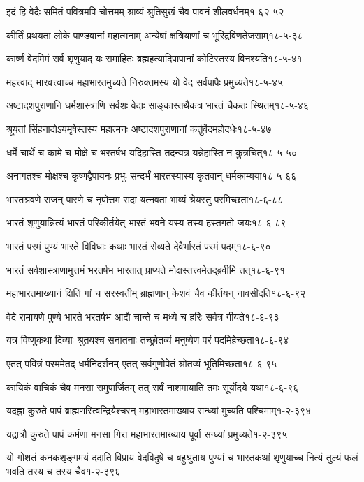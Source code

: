 \annotwolineshloka
{इदं हि वेदैः समितं पवित्रमपि चोत्तमम्}
{श्राव्यं श्रुतिसुखं चैव पावनं शीलवर्धनम्}{१-६२-५२}


\annotwolineshloka
{कीर्तिं प्रथयता लोके पाण्डवानां महात्मनाम्}
{अन्येषां क्षत्रियाणां च भूरिद्रविणतेजसाम्}{१८-५-३८}

\annotwolineshloka
{कार्ष्णं वेदमिमं सर्वं शृणुयाद् यः समाहितः}
{ब्रह्महत्यादिपापानां कोटिस्तस्य विनश्यति}{१८-५-४१}

\annotwolineshloka
{महत्त्वाद् भारवत्त्वाच्च महाभारतमुच्यते}
{निरुक्तमस्य यो वेद सर्वपापैः प्रमुच्यते}{१८-५-४५}

\annotwolineshloka
{अष्टादशपुराणानि धर्मशास्त्राणि सर्वशः}
{वेदाः साङ्कास्तथैकत्र भारतं चैकतः स्थितम्}{१८-५-४६}

\annotwolineshloka
{श्रूयतां सिंहनादोऽयमृषेस्तस्य महात्मनः}
{अष्टादशपुराणानां कर्तुर्वेदमहोदधेः}{१८-५-४७}

\annotwolineshloka
{धर्मे चार्थे च कामे च मोक्षे च भरतर्षभ}
{यदिहास्ति तदन्यत्र यन्नेहास्ति न कुत्रचित्}{१८-५-५०}

\annotwolineshloka
{अनागतश्च मोक्षश्च कृष्णद्वैपायनः प्रभुः}
{सन्दर्भं भारतस्यास्य कृतवान् धर्मकाम्यया}{१८-५-६६}

\annotwolineshloka
{भारतश्रवणे राजन् पारणे च नृपोत्तम}
{सदा यत्नवता भाव्यं श्रेयस्तु परमिच्छता}{१८-६-८८}

\annotwolineshloka
{भारतं शृणुयान्नित्यं भारतं परिकीर्तयेत्}
{भारतं भवने यस्य तस्य हस्तगतो जयः}{१८-६-८९}

\annotwolineshloka
{भारतं परमं पुण्यं भारते विविधाः कथाः}
{भारतं सेव्यते देवैर्भारतं परमं पदम्}{१८-६-९०}

\annotwolineshloka
{भारतं सर्वशास्त्राणामुत्तमं भरतर्षभ}
{भारतात् प्राप्यते मोक्षस्तत्त्वमेतद्ब्रवीमि तत्}{१८-६-९१}

\annotwolineshloka
{महाभारतमाख्यानं क्षितिं गां च सरस्वतीम्}
{ब्राह्मणान् केशवं चैव कीर्तयन् नावसीदति}{१८-६-९२}

\annotwolineshloka
{वेदे रामायणे पुण्ये भारते भरतर्षभ}
{आदौ चान्ते च मध्ये च हरिः सर्वत्र गीयते}{१८-६-९३}

\annotwolineshloka
{यत्र विष्णुकथा दिव्याः श्रुतयश्च सनातनाः}
{तच्छ्रोतव्यं मनुष्येण परं पदमिहेच्छता}{१८-६-९४}

\annotwolineshloka
{एतत् पवित्रं परममेतद् धर्मनिदर्शनम्}
{एतत् सर्वगुणोपेतं श्रोतव्यं भूतिमिच्छता}{१८-६-९५}

\annotwolineshloka
{कायिकं वाचिकं चैव मनसा समुपार्जितम्}
{तत् सर्वं नाशमायाति तमः सूर्योदये यथा}{१८-६-९६}

\annotwolineshloka
{यदह्ना कुरुते पापं ब्राह्मणस्त्विन्द्रियैश्चरन्}
{महाभारतमाख्याय सन्ध्यां मुच्यति पश्चिमाम्}{१-२-३९४}

\annotwolineshloka
{यद्रात्रौ कुरुते पापं कर्मणा मनसा गिरा}
{महाभारतमाख्याय पूर्वां सन्ध्यां प्रमुच्यते}{१-२-३९५}

\annofourlineindentedshloka
{यो गोशतं कनकशृङ्गमयं ददाति}
{विप्राय वेदविदुषे च बहुश्रुताय}
{पुण्यां च भारतकथां शृणुयाच्च नित्यं}
{तुल्यं फलं भवति तस्य च तस्य चैव}{१-२-३९६}


\hyperref[sec:start]{\closesection}